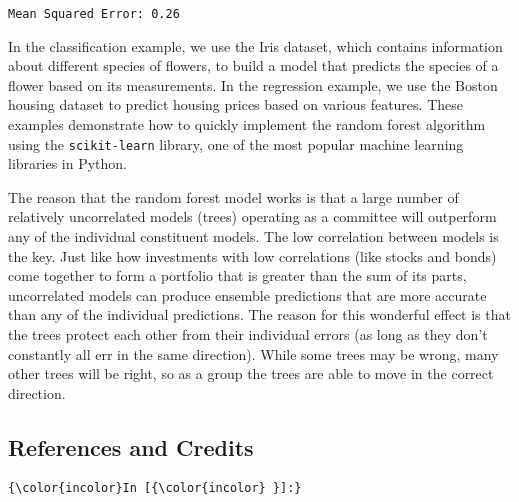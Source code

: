 \documentclass{article}
\begin{document}
    \begin{Verbatim}[commandchars=\\\{\}]
Mean Squared Error: 0.26

    \end{Verbatim}

    In the classification example, we use the Iris dataset, which contains
information about different species of flowers, to build a model that
predicts the species of a flower based on its measurements. In the
regression example, we use the Boston housing dataset to predict housing
prices based on various features. These examples demonstrate how to
quickly implement the random forest algorithm using the
\texttt{scikit-learn} library, one of the most popular machine learning
libraries in Python.

    The reason that the random forest model works is that a large number of
relatively uncorrelated models (trees) operating as a committee will
outperform any of the individual constituent models. The low correlation
between models is the key. Just like how investments with low
correlations (like stocks and bonds) come together to form a portfolio
that is greater than the sum of its parts, uncorrelated models can
produce ensemble predictions that are more accurate than any of the
individual predictions. The reason for this wonderful effect is that the
trees protect each other from their individual errors (as long as they
don't constantly all err in the same direction). While some trees may be
wrong, many other trees will be right, so as a group the trees are able
to move in the correct direction.

    \subsection{References and Credits}\label{references-and-credits}

    \begin{Verbatim}[commandchars=\\\{\}]
{\color{incolor}In [{\color{incolor} }]:} 
\end{Verbatim}


    
    
    
\end{document}
